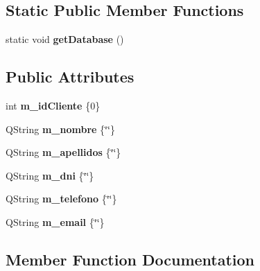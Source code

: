 \subsection*{Static Public Member Functions}
\begin{DoxyCompactItemize}
\item 
\mbox{\label{classCliente_a56dd19c1b620d62e50fe632e1a39fee2}} 
static void {\bfseries get\+Database} ()
\end{DoxyCompactItemize}
\subsection*{Public Attributes}
\begin{DoxyCompactItemize}
\item 
\mbox{\label{classCliente_a378a16e32e275bc0a438621850b214a0}} 
int {\bfseries m\+\_\+id\+Cliente} \{0\}
\item 
\mbox{\label{classCliente_ae59e0a369e0a2c2244841b8bb1e72417}} 
Q\+String {\bfseries m\+\_\+nombre} \{\char`\"{}\char`\"{}\}
\item 
\mbox{\label{classCliente_a498d1e9c29bb09b2f234a2daa8b908af}} 
Q\+String {\bfseries m\+\_\+apellidos} \{\char`\"{}\char`\"{}\}
\item 
\mbox{\label{classCliente_ab19b5e88e6c7236cff04a966aa204a35}} 
Q\+String {\bfseries m\+\_\+dni} \{\char`\"{}\char`\"{}\}
\item 
\mbox{\label{classCliente_a60e2692da61d73083faaa5ed093f7609}} 
Q\+String {\bfseries m\+\_\+telefono} \{\char`\"{}\char`\"{}\}
\item 
\mbox{\label{classCliente_a9b604cb3030a93ce01ced3ba24c84338}} 
Q\+String {\bfseries m\+\_\+email} \{\char`\"{}\char`\"{}\}
\end{DoxyCompactItemize}


\subsection{Member Function Documentation}
\mbox{\label{classCliente_a7411b49f5697dbb2eb47bff72f5681d4}} 

